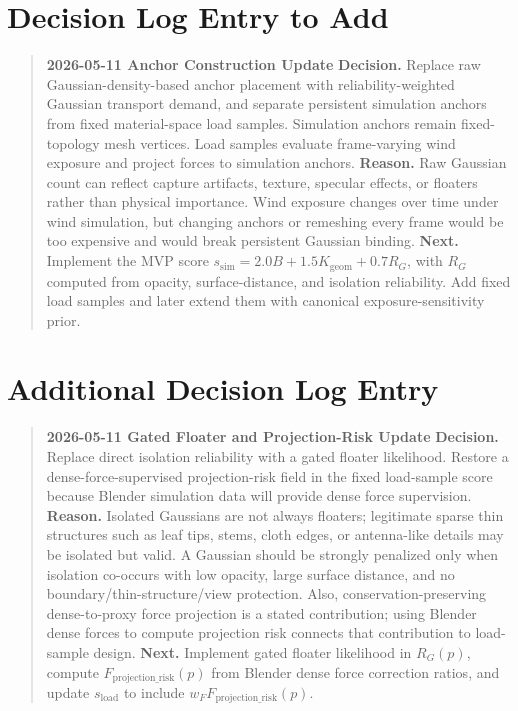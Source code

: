\documentclass[11pt,a4paper]{article}
\begin{document}
\section{Decision Log Entry to Add}

\begin{quote}
\textbf{2026-05-11 Anchor Construction Update}\newline
\textbf{Decision.} Replace raw Gaussian-density-based anchor placement with reliability-weighted Gaussian transport demand, and separate persistent simulation anchors from fixed material-space load samples. Simulation anchors remain fixed-topology mesh vertices. Load samples evaluate frame-varying wind exposure and project forces to simulation anchors.\newline
\textbf{Reason.} Raw Gaussian count can reflect capture artifacts, texture, specular effects, or floaters rather than physical importance. Wind exposure changes over time under wind simulation, but changing anchors or remeshing every frame would be too expensive and would break persistent Gaussian binding.\newline
\textbf{Next.} Implement the MVP score $s_{\mathrm{sim}}=2.0B+1.5K_{\mathrm{geom}}+0.7R_G$, with $R_G$ computed from opacity, surface-distance, and isolation reliability. Add fixed load samples and later extend them with canonical exposure-sensitivity prior.
\end{quote}


\section{Additional Decision Log Entry}

\begin{quote}
\textbf{2026-05-11 Gated Floater and Projection-Risk Update}\newline
\textbf{Decision.} Replace direct isolation reliability with a gated floater likelihood. Restore a dense-force-supervised projection-risk field in the fixed load-sample score because Blender simulation data will provide dense force supervision.\newline
\textbf{Reason.} Isolated Gaussians are not always floaters; legitimate sparse thin structures such as leaf tips, stems, cloth edges, or antenna-like details may be isolated but valid. A Gaussian should be strongly penalized only when isolation co-occurs with low opacity, large surface distance, and no boundary/thin-structure/view protection. Also, conservation-preserving dense-to-proxy force projection is a stated contribution; using Blender dense forces to compute projection risk connects that contribution to load-sample design.\newline
\textbf{Next.} Implement gated floater likelihood in $R_G(p)$, compute $F_{\mathrm{projection\_risk}}(p)$ from Blender dense force correction ratios, and update $s_{\mathrm{load}}$ to include $w_FF_{\mathrm{projection\_risk}}(p)$.
\end{quote}
\end{document}
